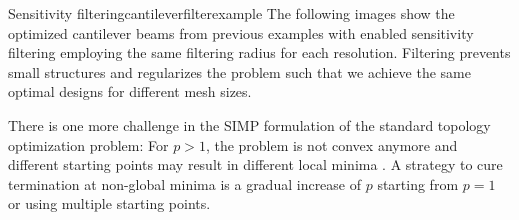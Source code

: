 \begin{example}{Sensitivity filtering}{cantileverfilterexample}
    The following images show the optimized cantilever beams from previous examples with enabled sensitivity filtering employing the same filtering radius for each resolution. Filtering prevents small structures and regularizes the problem such that we achieve the same optimal designs for different mesh sizes.
    \begin{center}
        
        
        
    \end{center}
\end{example}

There is one more challenge in the SIMP formulation of the standard topology optimization problem: For $p>1$, the problem is not convex anymore and different starting points may result in different local minima \cite{Christensen2008}. A strategy to cure termination at non-global minima is a gradual increase of $p$ starting from $p=1$ or using multiple starting points.

